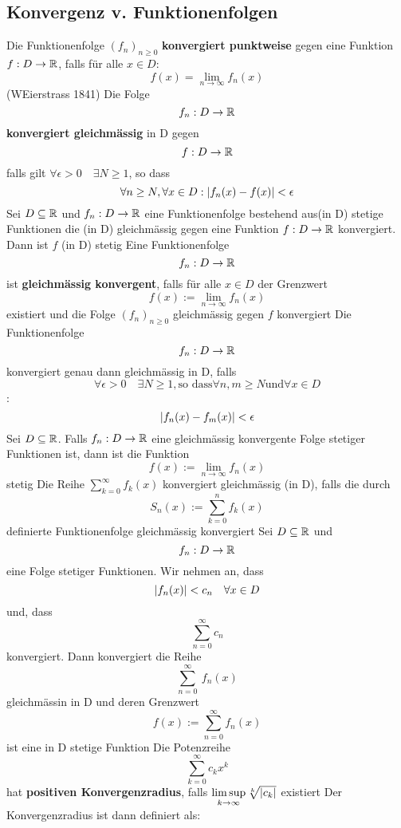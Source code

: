 \subsection{Konvergenz v. Funktionenfolgen}
 Die Funktionenfolge \((f_n)_{n \geq 0}\) \textbf{konvergiert punktweise} gegen eine Funktion \(f: D \rightarrow \mathbb{R}\), falls für alle \(x \in D :\)
\[f(x) = \lim\limits_{n \rightarrow \infty}f_n(x)\]
 (WEierstrass 1841) Die Folge
\[f_n : D \rightarrow \mathbb{R} \]
\textbf{konvergiert gleichmässig} in D gegen
\[f : D  \rightarrow \mathbb{R}\]
falls gilt \( \forall \epsilon > 0 \quad \exists N \geq 1\), so dass
\[\forall n \geq N, \forall x \in D : \left\lvert f_n(x) - f(x)  \right\rvert < \epsilon \] \newline
{} Sei \(D \subseteq \mathbb{R}\) und \(f_n : D \rightarrow \mathbb{R} \) eine Funktionenfolge bestehend aus(in D) stetige Funktionen die (in D) gleichmässig gegen eine Funktion \(f: D \rightarrow \mathbb{R} \) konvergiert. Dann ist \(f\) (in D) stetig
 Eine Funktionenfolge
\[f_n : D \rightarrow \mathbb{R}\]
ist \textbf{gleichmässig konvergent}, falls für alle \(x \in D\) der Grenzwert
\[f(x) := \lim\limits_{n \rightarrow \infty} f_n(x)\]
existiert und die Folge \((f_n)_{n \geq 0}\) gleichmässig gegen \(f\) konvergiert
 Die Funktionenfolge
\[f_n : D \rightarrow \mathbb{R} \]
konvergiert genau dann gleichmässig in D, falls
\[\forall \epsilon > 0 \quad \exists N \geq 1 , \text{so dass} \forall n,m \geq N \text{und} \forall x \in D\] : \newline
\[ \left\lvert f_n(x) - f_m(x) \right\rvert < \epsilon \]
 Sei \(D \subseteq \mathbb{R}\). Falls \(f_n : D \rightarrow \mathbb{R} \) eine gleichmässig konvergente Folge stetiger Funktionen ist, dann ist die Funktion
\[f(x) := \lim\limits_{n \rightarrow \infty} f_n(x)\] stetig
 Die Reihe \(\sum_{k=0}^\infty f_k(x)\) konvergiert gleichmässig (in D), falls die durch
\[S_n(x) := \sum_{k=0}^{n}f_k(x)\] definierte Funktionenfolge gleichmässig konvergiert
 Sei \(D \subseteq \mathbb{R} \) und
\[f_n : D \rightarrow \mathbb{R} \]
eine Folge stetiger Funktionen. Wir nehmen an, dass
\[\left\lvert f_n(x) \right\rvert < c_n \quad \forall x \in D \]
und, dass \[\sum_{n=0}^\infty c_n\] konvergiert. Dann konvergiert die Reihe
\[\sum_{n=0}^\infty\ f_n(x)\]
gleichmässin in D und deren Grenzwert
\[f(x) := \sum_{n=0}^{\infty} f_n(x)\]
ist eine in D stetige Funktion \newline
{} Die Potenzreihe
\[\sum_{k=0}^\infty c_kx^k\]
hat \textbf{positiven Konvergenzradius}, falls \(\limsup\limits_{k \rightarrow \infty} \sqrt[k]{\left\lvert c_k \right\rvert}\) existiert
Der Konvergenzradius ist dann definiert als:

